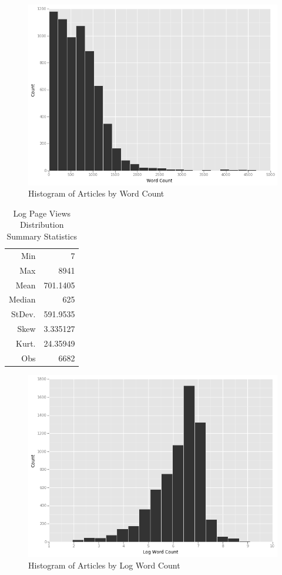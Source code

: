 \documentclass[fleqn,12pt]{SelfArx} %
\begin{document}
\begin{figure}[ht]\centering
\includegraphics[width=\linewidth]{wordcount_hist}
\caption{Histogram of Articles by Word Count}
\label{fig:pv_hist}
\end{figure}

\begin{table}[hbt]
\caption{Log Page Views Distribution Summary Statistics}
\centering
\begin{tabular}{rr}
\toprule
Min               &  7\\
Max               &  8941\\  
Mean              &  701.1405\\
Median            &  625\\
StDev.            &  591.9535\\
Skew              &  3.335127\\
Kurt.             &  24.35949\\
\midrule
Obs &  6682\\
\bottomrule
\end{tabular}
\end{table}

\begin{figure}[ht]\centering
\includegraphics[width=\linewidth]{log_wordcount_hist}
\caption{Histogram of Articles by Log Word Count}
\label{fig:lpv_hist}
\end{figure}
\end{document}
